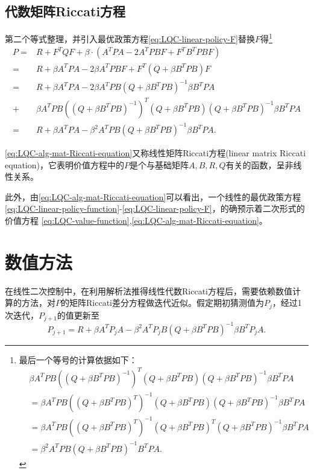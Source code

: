 \subsection{代数矩阵Riccati方程}
第二个等式整理，并引入最优政策方程\eqref{eq:LQC-linear-policy-F}替换$F$得\footnote{最后一个等号的计算依据如下：
\begin{align*}
  &\beta A^T P B \left(\left(Q + \beta B^T P B \right)^{-1}\right)^T \left(Q + \beta B^T P B \right) \left(Q + \beta B^T P B \right)^{-1} \beta B^T P A \\
  &=  \beta A^T P B \left(\left(Q + \beta B^T P B \right)^{T}\right)^{-1} \left(Q + \beta B^T P B \right) \left(Q + \beta B^T P B \right)^{-1} \beta B^T P A \\
  &=  \beta A^T P B \left(\left(Q + \beta B^T P B \right)^{T}\right)^{-1} \left(Q + \beta B^T P B \right)^T \left(Q + \beta B^T P B \right)^{-1} \beta B^T P A \\
  &= \beta^2 A^T P B \left(Q + \beta B^T P B \right)^{-1} B^T P A.
\end{align*}
}
\begin{align}
  P =& R + F^T Q F + \beta \cdot \left(A^T P A - 2 A^T P B F + F^T B^T P B F\right) \nonumber \\
  =& R + \beta A^T P A - 2 \beta A^T P B F + F^T \left(Q + \beta B^T P B \right) F \nonumber \\
  =& R + \beta A^T P A - 2 \beta A^T P B \left(Q + \beta B^T P B \right)^{-1} \beta B^T P A \nonumber \\
  + & \beta A^T P B \left(\left(Q + \beta B^T P B \right)^{-1}\right)^T \left(Q + \beta B^T P B \right) \left(Q + \beta B^T P B \right)^{-1} \beta B^T P A \nonumber \\
  \label{eq:LQC-alg-mat-Riccati-equation}
  =& R + \beta A^T P A - \beta^2 A^T P B \left(Q + \beta B^T P B \right)^{-1} \beta B^T P A.
\end{align}

\eqref{eq:LQC-alg-mat-Riccati-equation}又称线性矩阵Riccati方程(linear matrix Riccati equation)，它表明价值方程中的$P$是个与基础矩阵$A,B,R,Q$有关的函数，呈非线性关系。

此外，由\eqref{eq:LQC-alg-mat-Riccati-equation}可以看出，一个线性的最优政策方程\eqref{eq:LQC-linear-policy-function}-\eqref{eq:LQC-linear-policy-F}，的确预示着二次形式的价值方程  \eqref{eq:LQC-value-function},\eqref{eq:LQC-alg-mat-Riccati-equation}。

\section{数值方法}
在线性二次控制中，在利用解析法推得线性代数Riccati方程后，需要依赖数值计算的方法，对$P$的矩阵Riccati差分方程做迭代近似。假定期初猜测值为$P_{j}$，经过1次迭代，$P_{j+1}$的值更新至
\begin{equation}
  \label{eq:LQC-mat-Riccati-equation-iteration}
  P_{j+1}=R + \beta A^T P_j A - \beta^2 A^T P_j B \left(Q + \beta B^T P B \right)^{-1} \beta B^T P_j A.
\end{equation}

